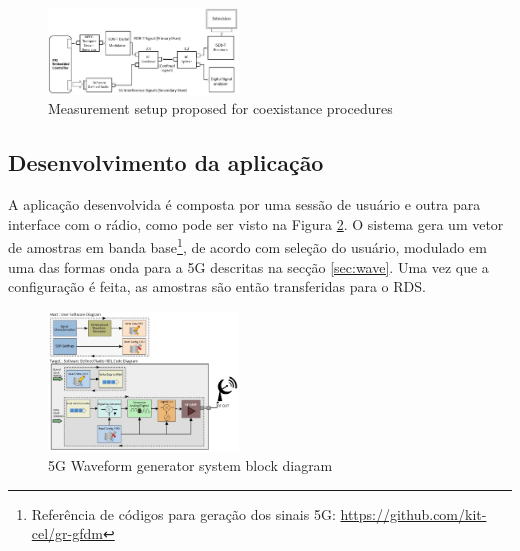 \begin{figure}[h!]
    \centering
    \includegraphics[width=0.45\textwidth]{Figures/setup_full_v3.jpg}
    \caption{Measurement setup proposed for coexistance procedures}
    \label{fig:SetupMedidas}
\end{figure}


\subsection {Desenvolvimento da aplicação}

A aplicação desenvolvida é composta por uma sessão de usuário e outra para interface com o rádio, como pode ser visto na Figura \ref{fig:DiagramaLabview}. O sistema gera um vetor de amostras em banda base\footnote{Referência de códigos para geração dos sinais 5G: \url{https://github.com/kit-cel/gr-gfdm}}, de acordo com seleção do usuário, modulado em uma das formas onda para a 5G descritas na secção \ref{sec:wave}. Uma vez que a configuração é feita, as amostras são então transferidas para o RDS. \par





\begin{figure}[h!]
    \centering
    \includegraphics[width=0.45\textwidth]{Figures/Diagrama_Labview_full_v3.jpg}
    \caption{5G Waveform generator system block diagram}
    \label{fig:DiagramaLabview}
\end{figure}


